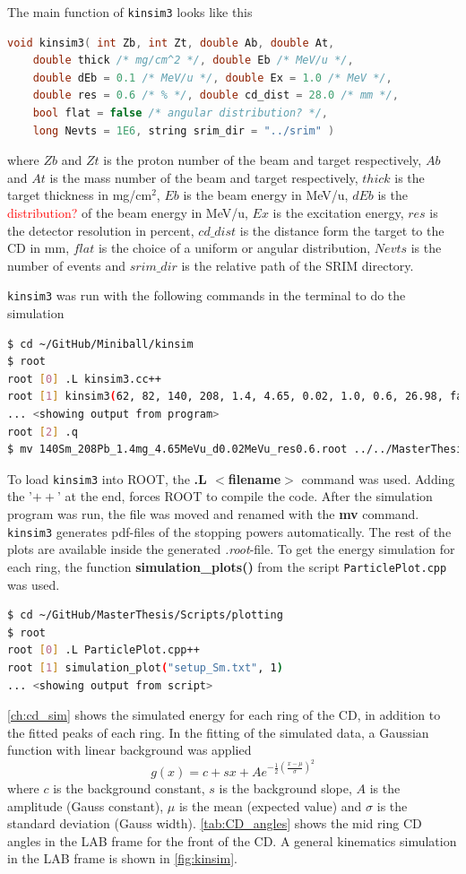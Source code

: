 \documentclass[twoside,english]{uiofysmaster/uiofysmaster}
\let\orgautoref\autoref
\renewcommand{\autoref}
        {%
		 \def\subsectionautorefname{Section}%
		 \def\subsubsectionautorefname{Section}%
          \orgautoref}
\begin{document}
The main function of \texttt{kinsim3} looks like this
\begin{lstlisting}[language=c++]
void kinsim3( int Zb, int Zt, double Ab, double At, 
	double thick /* mg/cm^2 */, double Eb /* MeV/u */, 
	double dEb = 0.1 /* MeV/u */, double Ex = 1.0 /* MeV */, 
	double res = 0.6 /* % */, double cd_dist = 28.0 /* mm */, 
	bool flat = false /* angular distribution? */, 
	long Nevts = 1E6, string srim_dir = "../srim" )
\end{lstlisting}
where $Zb$ and $Zt$ is the proton number of the beam and target respectively, $Ab$ and $At$ is the mass number of the beam and target respectively, $thick$ is the target thickness in mg/cm$^2$, $Eb$ is the beam energy in MeV/u, $dEb$ is the \textcolor{red}{distribution?} of the beam energy in MeV/u, $Ex$ is the excitation energy, $res$ is the detector resolution in percent, $cd\_dist$ is the distance form the target to the CD in mm, $flat$ is the choice of a uniform or angular distribution, $Nevts$ is the number of events and $srim\_dir$ is the relative path of the SRIM directory.

\texttt{kinsim3} was run with the following commands in the terminal to do the simulation
\begin{lstlisting}[language=sh]
$ cd ~/GitHub/Miniball/kinsim
$ root
root [0] .L kinsim3.cc++
root [1] kinsim3(62, 82, 140, 208, 1.4, 4.65, 0.02, 1.0, 0.6, 26.98, false, 1e6, "../SRIM")
... <showing output from program>
root [2] .q
$ mv 140Sm_208Pb_1.4mg_4.65MeVu_d0.02MeVu_res0.6.root ../../MasterThesis/Sorted_data/sim_140Sm_208Pb.root
\end{lstlisting}
To load \texttt{kinsim3} into ROOT, the \textbf{.L $<$filename$>$} command was used. Adding the '$++$' at the end, forces ROOT to compile the code. 
After the simulation program was run, the file was moved and renamed with the \textbf{mv} command. 
\texttt{kinsim3} generates pdf-files of the stopping powers automatically. 
The rest of the plots are available inside the generated \textit{.root}-file. 
To get the energy simulation for each ring, the function \textbf{simulation\_plots()} from the script \texttt{ParticlePlot.cpp} was used. 
\begin{lstlisting}[language=sh]
$ cd ~/GitHub/MasterThesis/Scripts/plotting
$ root
root [0] .L ParticlePlot.cpp++
root [1] simulation_plot("setup_Sm.txt", 1)
... <showing output from script>
\end{lstlisting}

\autoref{ch:cd_sim} shows the simulated energy for each ring of the CD, in addition to the fitted peaks of each ring.
In the fitting of the simulated data, a Gaussian function with linear background was applied
\begin{equation}
	g(x) = c + sx + A e^{-\frac{1}{2}\left(\frac{x - \mu}{\sigma}\right)^2}
\end{equation}
where $c$ is the background constant, $s$ is the background slope, $A$ is the amplitude (Gauss constant), $\mu$ is the mean (expected value) and $\sigma$ is the standard deviation (Gauss width). 
\autoref{tab:CD_angles} shows the mid ring CD angles in the LAB frame for the front of the CD. 
A general kinematics simulation in the LAB frame is shown in \autoref{fig:kinsim}. 
\end{document}
